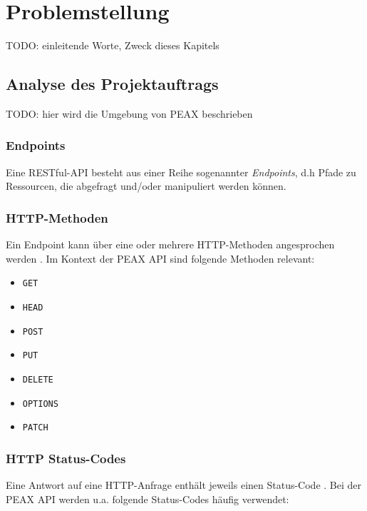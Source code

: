 \section{Problemstellung}

TODO: einleitende Worte, Zweck dieses Kapitels

\subsection{Analyse des Projektauftrags}

TODO: hier wird die Umgebung von PEAX beschrieben

\subsubsection{Endpoints}

Eine RESTful-API besteht aus einer Reihe sogenannter \textit{Endpoints}, d.h Pfade zu Ressourcen, die abgefragt und/oder manipuliert werden können.

\subsubsection{HTTP-Methoden}

Ein Endpoint kann über eine oder mehrere HTTP-Methoden angesprochen werden \cite[Abschnitt 4.3]{RFC7231}. Im Kontext der PEAX API sind folgende Methoden relevant:

\begin{itemize}
	\item \texttt{GET}
	\item \texttt{HEAD}
	\item \texttt{POST}
	\item \texttt{PUT}
	\item \texttt{DELETE}
	\item \texttt{OPTIONS}
	\item \texttt{PATCH} \cite{RFC5789}
\end{itemize}

\subsubsection{HTTP Status-Codes}

Eine Antwort auf eine HTTP-Anfrage enthält jeweils einen Status-Code \cite[Abschnitt 6]{RFC7231}. Bei der PEAX API werden u.a. folgende Status-Codes häufig verwendet:

